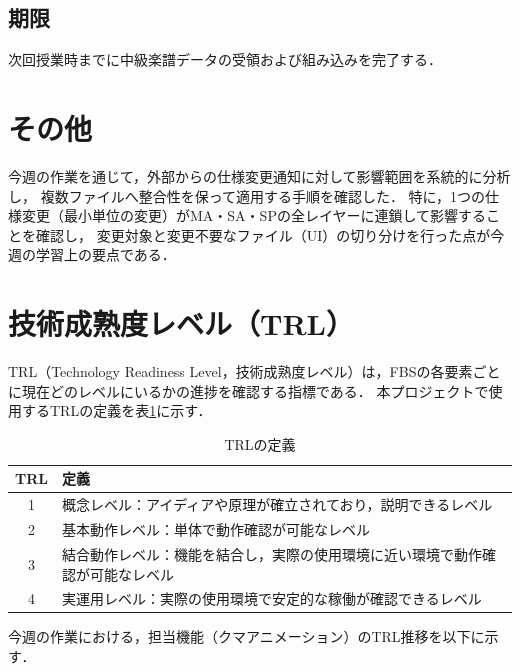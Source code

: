 \documentclass[uplatex,dvipdfmx]{jlreq}
\begin{document}
\subsection{期限}
次回授業時までに中級楽譜データの受領および組み込みを完了する．

\section{その他}
今週の作業を通じて，外部からの仕様変更通知に対して影響範囲を系統的に分析し，
複数ファイルへ整合性を保って適用する手順を確認した．
特に，1つの仕様変更（最小単位の変更）がMA・SA・SPの全レイヤーに連鎖して影響することを確認し，
変更対象と変更不要なファイル（UI）の切り分けを行った点が今週の学習上の要点である．


\newpage
\section{技術成熟度レベル（TRL）}
TRL（Technology Readiness Level，技術成熟度レベル）は，FBSの各要素ごとに現在どのレベルにいるかの進捗を確認する指標である．
本プロジェクトで使用するTRLの定義を表\ref{trl_def}に示す．

\begin{table}[H]
  \centering
  \small
  \begin{tabular}{c|l}
    \hline
    TRL & 定義 \\ \hline \hline
    1 & 概念レベル：アイディアや原理が確立されており，説明できるレベル \\ \hline
    2 & 基本動作レベル：単体で動作確認が可能なレベル \\ \hline
    3 & 結合動作レベル：機能を結合し，実際の使用環境に近い環境で動作確認が可能なレベル \\ \hline
    4 & 実運用レベル：実際の使用環境で安定的な稼働が確認できるレベル \\ \hline
  \end{tabular}
  \caption{TRLの定義}
  \label{trl_def}
\end{table}

今週の作業における，担当機能（クマアニメーション）のTRL推移を以下に示す．
\end{document}
